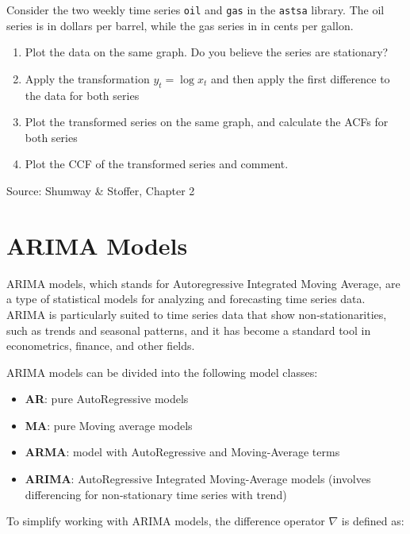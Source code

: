 \begin{exercisebox}

Consider the two weekly time series \texttt{oil} and \texttt{gas} in the  \texttt{astsa} library. The oil series is in dollars per barrel, while the gas series in in cents per gallon.
\begin{enumerate}
   \item Plot the data on the same graph. Do you believe the series are stationary?
   \item Apply the transformation $y_t = \log x_t$ and then apply the first difference to the data for both series
   \item Plot the transformed series on the same graph, and calculate the ACFs for both series
   \item Plot the CCF of the transformed series and comment.
\end{enumerate}

{\footnotesize \vspace{\baselineskip} Source: Shumway \& Stoffer, Chapter 2}
\end{exercisebox}

\section{ARIMA Models}

ARIMA models, which stands for Autoregressive Integrated Moving Average, are a type of statistical models for analyzing and forecasting time series data. ARIMA is particularly suited to time series data that show non-stationarities, such as trends and seasonal patterns, and it has become a standard tool in econometrics, finance, and other fields.

ARIMA models can be divided into the following model classes:
\begin{itemize}
  \item \textbf{AR}: pure AutoRegressive models
  \item \textbf{MA}: pure Moving average models
  \item \textbf{ARMA}: model with AutoRegressive and Moving-Average terms
  \item \textbf{ARIMA}: AutoRegressive Integrated Moving-Average models (involves differencing for non-stationary time series with trend)
\end{itemize}

To simplify working with ARIMA models, the difference operator $\nabla$ is defined as:

